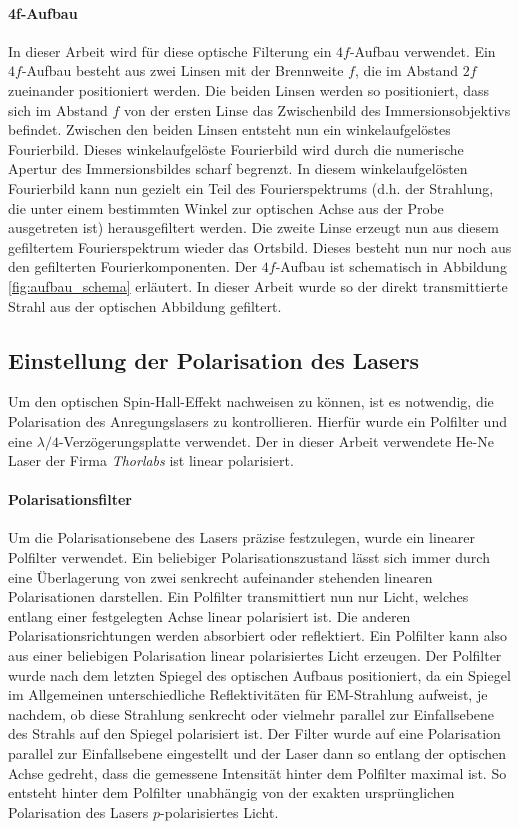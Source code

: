 \documentclass[titlepage]{article}
\begin{document}
	\paragraph{4f-Aufbau}
	In dieser Arbeit wird für diese optische Filterung ein $4f$-Aufbau verwendet. Ein $4f$-Aufbau besteht aus zwei Linsen mit der Brennweite $f$, die im Abstand $2f$ zueinander positioniert werden. Die beiden Linsen werden so positioniert, dass sich im Abstand $f$ von der ersten Linse das Zwischenbild des Immersionsobjektivs befindet. Zwischen den beiden Linsen entsteht nun ein winkelaufgelöstes Fourierbild. Dieses winkelaufgelöste Fourierbild wird durch die numerische Apertur des Immersionsbildes scharf begrenzt.  In diesem winkelaufgelösten Fourierbild kann nun gezielt ein Teil des Fourierspektrums (d.h. der Strahlung, die unter einem bestimmten Winkel zur optischen Achse aus der Probe ausgetreten ist) herausgefiltert werden. Die zweite Linse erzeugt nun aus diesem gefiltertem Fourierspektrum wieder das Ortsbild. Dieses besteht nun nur noch aus den gefilterten Fourierkomponenten. Der $4f$-Aufbau ist schematisch in Abbildung \ref{fig:aufbau_schema} erläutert. In dieser Arbeit wurde so der direkt transmittierte Strahl aus der optischen Abbildung gefiltert.
	\subsection{Einstellung der Polarisation des Lasers}
	\label{sec:cntr_pol}
	Um den optischen Spin-Hall-Effekt nachweisen zu können, ist es notwendig, die Polarisation des Anregungslasers zu kontrollieren. Hierfür wurde ein Polfilter und eine $\lambda /4$-Verzögerungsplatte verwendet. Der in dieser Arbeit verwendete He-Ne Laser der Firma \textit{Thorlabs} ist linear polarisiert. 
	\paragraph{Polarisationsfilter}	
	Um die Polarisationsebene des Lasers präzise festzulegen, wurde ein linearer Polfilter verwendet. Ein beliebiger Polarisationszustand lässt sich immer durch eine Überlagerung von zwei senkrecht aufeinander stehenden linearen Polarisationen darstellen. Ein Polfilter transmittiert nun nur Licht, welches entlang einer festgelegten Achse linear polarisiert ist. Die anderen Polarisationsrichtungen werden absorbiert oder reflektiert. Ein Polfilter kann also aus einer beliebigen Polarisation linear polarisiertes Licht erzeugen. Der  Polfilter wurde nach dem letzten Spiegel des optischen Aufbaus positioniert, da ein Spiegel im Allgemeinen unterschiedliche Reflektivitäten für EM-Strahlung aufweist, je nachdem, ob diese Strahlung senkrecht oder vielmehr parallel zur Einfallsebene des Strahls auf den Spiegel polarisiert ist. Der Filter wurde auf eine Polarisation parallel zur Einfallsebene eingestellt und der Laser dann so entlang der optischen Achse gedreht, dass die gemessene Intensität hinter dem Polfilter maximal ist. So entsteht hinter dem Polfilter unabhängig  von der exakten ursprünglichen Polarisation des Lasers $p$-polarisiertes Licht.
\end{document}
